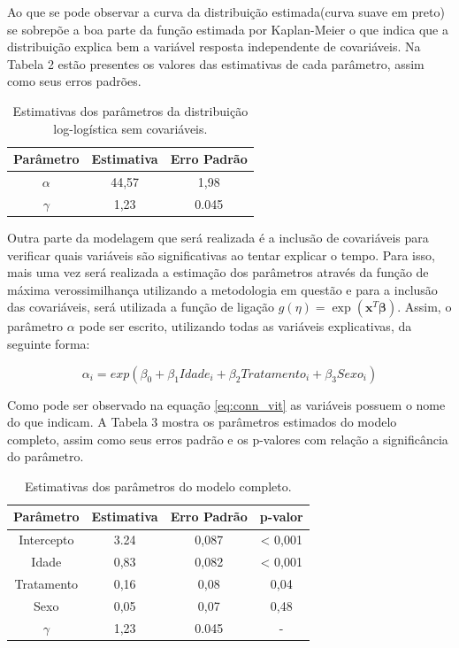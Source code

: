 \documentclass[a4paper,12pt]{article}
\begin{document}
Ao que se pode observar a curva da distribuição estimada(curva suave em preto) se sobrepõe a boa parte da função estimada por Kaplan-Meier o que indica que a distribuição explica bem a variável resposta independente de covariáveis. Na Tabela 2 estão presentes os valores das estimativas de cada parâmetro, assim como seus erros padrões.

\begin{table}[H]
\centering
\caption{Estimativas dos parâmetros da distribuição log-logística sem covariáveis.}
\begin{tabular}{c|cc}
\hline
Parâmetro & Estimativa & Erro Padrão \\
\hline
$\alpha$ & 44,57 & 1,98  \\

$\gamma$ & 1,23 & 0.045 \\
\hline
\end{tabular}
\end{table}

Outra parte da modelagem que será realizada é a inclusão de covariáveis para verificar quais variáveis são significativas ao tentar explicar o tempo. Para isso, mais uma vez será realizada a estimação dos parâmetros através da função de máxima verossimilhança utilizando a metodologia em questão e para a inclusão das covariáveis, será utilizada a função de ligação $g(\eta) = \exp(\boldsymbol{x}^T\boldsymbol{\beta})$. Assim, o parâmetro $\alpha$ pode ser escrito, utilizando todas as variáveis explicativas, da seguinte forma:

\begin{equation} \label{eq:conn_vit}
\alpha_i = exp(\beta_0 + \beta_1Idade_i + \beta_2Tratamento_i + \beta_3Sexo_i)
\end{equation}

Como pode ser observado na equação \ref{eq:conn_vit} as variáveis possuem o nome do que indicam. A Tabela 3 mostra os parâmetros estimados do modelo completo, assim como seus erros padrão e os p-valores com relação a significância do parâmetro.

\begin{table}[H]
\centering
\caption{Estimativas dos parâmetros do modelo completo.}
\begin{tabular}{c|ccc}
\hline
Parâmetro & Estimativa & Erro Padrão & p-valor \\
\hline
Intercepto & 3.24 & 0,087 & < 0,001 \\

Idade & 0,83 & 0,082 & < 0,001 \\

Tratamento & 0,16 & 0,08 & 0,04 \\

Sexo & 0,05 & 0,07 & 0,48 \\

$\gamma$ & 1,23 & 0.045 & - \\
\hline
\end{tabular}
\end{table}
\end{document}
